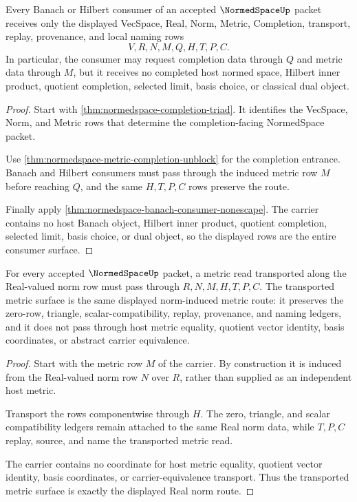 \begin{theorem}
\label{thm:normedspace-banach-hilbert-consumer-route}
Every Banach or Hilbert consumer of an accepted $\NormedSpaceUp$ packet receives only the displayed VecSpace, Real, Norm, Metric, Completion, transport, replay, provenance, and local naming rows
$$
V,R,N,M,Q,H,T,P,C .
$$
In particular, the consumer may request completion data through $Q$ and metric data through $M$, but it receives no completed host normed space, Hilbert inner product, quotient completion, selected limit, basis choice, or classical dual object.
\end{theorem}
\begin{proof}
Start with \autoref{thm:normedspace-completion-triad}. It identifies the VecSpace, Norm, and Metric rows that determine the completion-facing NormedSpace packet.

Use \autoref{thm:normedspace-metric-completion-unblock} for the completion entrance. Banach and Hilbert consumers must pass through the induced metric row $M$ before reaching $Q$, and the same $H,T,P,C$ rows preserve the route.

Finally apply \autoref{thm:normedspace-banach-consumer-nonescape}. The carrier contains no host Banach object, Hilbert inner product, quotient completion, selected limit, basis choice, or dual object, so the displayed rows are the entire consumer surface.
\end{proof}

\begin{theorem}
\label{thm:normedspace-real-metric-transport}
For every accepted $\NormedSpaceUp$ packet, a metric read transported along the
Real-valued norm row must pass through $R,N,M,H,T,P,C$. The transported metric
surface is the same displayed norm-induced metric route: it preserves the
zero-row, triangle, scalar-compatibility, replay, provenance, and naming
ledgers, and it does not pass through host metric equality, quotient vector
identity, basis coordinates, or abstract carrier equivalence.
\end{theorem}
\begin{proof}
Start with the metric row $M$ of the carrier. By construction it is induced
from the Real-valued norm row $N$ over $R$, rather than supplied as an
independent host metric.

Transport the rows componentwise through $H$. The zero, triangle, and scalar
compatibility ledgers remain attached to the same Real norm data, while $T,P,C$
replay, source, and name the transported metric read.

The carrier contains no coordinate for host metric equality, quotient vector
identity, basis coordinates, or carrier-equivalence transport. Thus the
transported metric surface is exactly the displayed Real norm route.
\end{proof}

